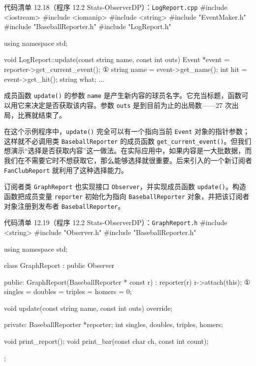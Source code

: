 \begin{codeboxt}{代码清单 12.18（程序 12.2 Stats-ObserverDP）：\texttt{Log\allowbreak{}Report.\allowbreak{}cpp}}
#include <iostream>
#include <iomanip>
#include <string>
#include "EventMaker.h"
#include "BaseballReporter.h"
#include "LogReport.h"

using namespace std;

void LogReport::update(const string name, const int outs)
{
    Event  *event = reporter->get_current_event();      ①
    string  name  = event->get_name();
    int     hit   = event->get_hit();
    string  what;
    ...
}
\end{codeboxt}
\par

成员函数 \texttt{update()} 的参数 \texttt{name} 是产生新内容的球员名字。它充当标题，函数可以用它来决定是否获取该内容。参数 \texttt{outs} 是到目前为止的出局数——27 次出局，比赛就结束了。

在这个示例程序中，\texttt{update()} 完全可以有一个指向当前 \texttt{Event} 对象的指针参数；这样就不必调用类 \texttt{Baseball\allowbreak{}Reporter} 的成员函数 \texttt{get\_\allowbreak{}current\_\allowbreak{}event(\allowbreak{})\allowbreak{}}。但我们想演示“选择是否获取内容”这一做法。在实际应用中，如果内容是一大批数据，而我们在不需要它时不想获取它，那么能够选择就很重要。后来引入的一个新订阅者 \texttt{Fan\allowbreak{}Club\allowbreak{}Report} 就利用了这种选择能力。

订阅者类 \texttt{Graph\allowbreak{}Report} 也实现接口 \texttt{Observer}，并实现成员函数 \texttt{update()}。构造函数把成员变量 \texttt{reporter} 初始化为指向 \texttt{Baseball\allowbreak{}Reporter} 对象，并把该订阅者对象注册到发布者 \texttt{Baseball\allowbreak{}Reporter}。

\begin{codeboxt}{代码清单 12.19（程序 12.2 Stats-ObserverDP）：\texttt{Graph\allowbreak{}Report.\allowbreak{}h}}
#include <string>
#include "Observer.h"
#include "BaseballReporter.h"

using namespace std;

class GraphReport : public Observer
{
public:
    GraphReport(BaseballReporter * const r) : reporter(r)
    {
        r->attach(this);                             ①
        singles = doubles = triples = homers = 0;
    }

    void update(const string name, const int outs) override;

private:
    BaseballReporter *reporter;
    int singles, doubles, triples, homers;

    void print_report();
    void print_bar(const char ch, const int count);
};
\end{codeboxt}
\par

